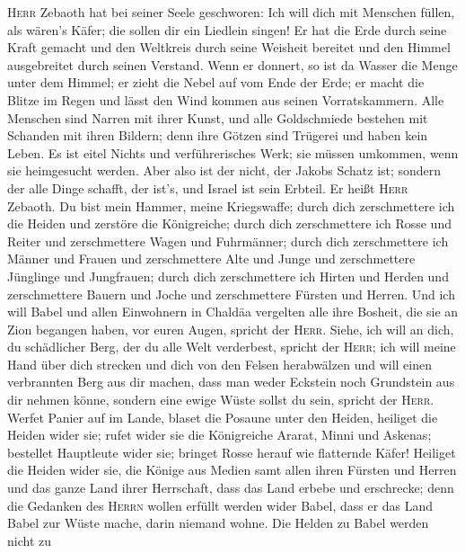 \textsc{Herr} Zebaoth hat bei seiner Seele geschworen: Ich will dich mit
Menschen füllen, als wären's Käfer; die sollen dir ein Liedlein singen!
 Er hat die Erde durch seine Kraft gemacht und den
Weltkreis durch seine Weisheit bereitet und den Himmel ausgebreitet
durch seinen Verstand.  Wenn er donnert, so ist da Wasser
die Menge unter dem Himmel; er zieht die Nebel auf vom Ende der Erde; er
macht die Blitze im Regen und lässt den Wind kommen aus seinen
Vorratskammern.  Alle Menschen sind Narren mit ihrer
Kunst, und alle Goldschmiede bestehen mit Schanden mit ihren Bildern;
denn ihre Götzen sind Trügerei und haben kein Leben.  Es
ist eitel Nichts und verführerisches Werk; sie müssen umkommen, wenn sie
heimgesucht werden.  Aber also ist der nicht, der Jakobs
Schatz ist; sondern der alle Dinge schafft, der ist's, und Israel ist
sein Erbteil. Er heißt \textsc{Herr} Zebaoth.  Du bist
mein Hammer, meine Kriegswaffe; durch dich zerschmettere ich die Heiden
und zerstöre die Königreiche;  durch dich zerschmettere
ich Rosse und Reiter und zerschmettere Wagen und Fuhrmänner;
 durch dich zerschmettere ich Männer und Frauen und
zerschmettere Alte und Junge und zerschmettere Jünglinge und Jungfrauen;
 durch dich zerschmettere ich Hirten und Herden und
zerschmettere Bauern und Joche und zerschmettere Fürsten und Herren.
 Und ich will Babel und allen Einwohnern in Chaldäa
vergelten alle ihre Bosheit, die sie an Zion begangen haben, vor euren
Augen, spricht der \textsc{Herr}.  Siehe, ich will an
dich, du schädlicher Berg, der du alle Welt verderbest, spricht der
\textsc{Herr}; ich will meine Hand über dich strecken und dich von den
Felsen herabwälzen und will einen verbrannten Berg aus dir machen,
 dass man weder Eckstein noch Grundstein aus dir nehmen
könne, sondern eine ewige Wüste sollst du sein, spricht der
\textsc{Herr}.  Werfet Panier auf im Lande, blaset die
Posaune unter den Heiden, heiliget die Heiden wider sie; rufet wider sie
die Königreiche Ararat, Minni und Askenas; bestellet Hauptleute wider
sie; bringet Rosse herauf wie flatternde Käfer!  Heiliget
die Heiden wider sie, die Könige aus Medien samt allen ihren Fürsten und
Herren und das ganze Land ihrer Herrschaft,  dass das
Land erbebe und erschrecke; denn die Gedanken des \textsc{Herrn} wollen
erfüllt werden wider Babel, dass er das Land Babel zur Wüste mache,
darin niemand wohne.  Die Helden zu Babel werden nicht zu
